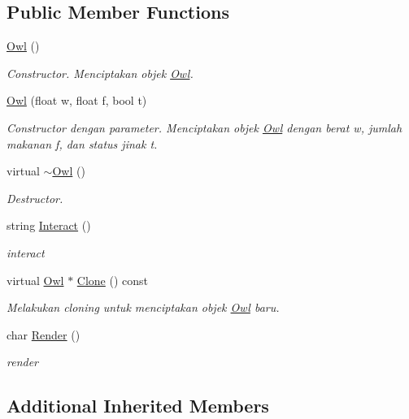 \subsection*{Public Member Functions}
\begin{DoxyCompactItemize}
\item 
\hyperlink{classOwl_a0a5c549eb9ac3099f04dbcea78c79f6a}{Owl} ()
\begin{DoxyCompactList}\small\item\em Constructor. Menciptakan objek \hyperlink{classOwl}{Owl}. \end{DoxyCompactList}\item 
\hyperlink{classOwl_abdec4b1b8d1f146b55175bae78888a1d}{Owl} (float w, float f, bool t)
\begin{DoxyCompactList}\small\item\em Constructor dengan parameter. Menciptakan objek \hyperlink{classOwl}{Owl} dengan berat w, jumlah makanan f, dan status jinak t. \end{DoxyCompactList}\item 
virtual \hyperlink{classOwl_af8238b610fbfd53c4d3153fb2d993ab7}{$\sim$\+Owl} ()
\begin{DoxyCompactList}\small\item\em Destructor. \end{DoxyCompactList}\item 
string \hyperlink{classOwl_ac3c735f8a34b46780a0efd052319e7f3}{Interact} ()
\begin{DoxyCompactList}\small\item\em interact \end{DoxyCompactList}\item 
virtual \hyperlink{classOwl}{Owl} $\ast$ \hyperlink{classOwl_a585e73d53d76b2db489613b7f0b6eecc}{Clone} () const 
\begin{DoxyCompactList}\small\item\em Melakukan cloning untuk menciptakan objek \hyperlink{classOwl}{Owl} baru. \end{DoxyCompactList}\item 
char \hyperlink{classOwl_ab4ecc1fc8da822f97299709508f7806d}{Render} ()
\begin{DoxyCompactList}\small\item\em render \end{DoxyCompactList}\end{DoxyCompactItemize}
\subsection*{Additional Inherited Members}


